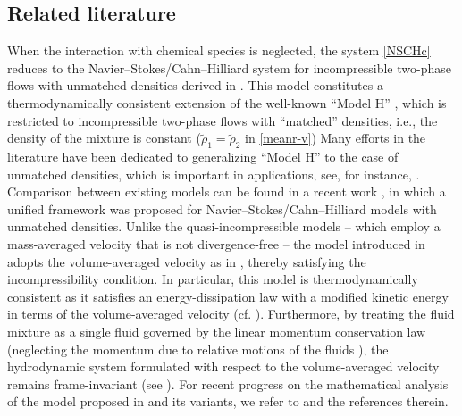 \documentclass[11pt,reqno]{amsart}
\begin{document}
\subsection{Related literature}
When the interaction with chemical species is neglected, the system \eqref{NSCHc} reduces to the Navier--Stokes/Cahn--Hilliard system for incompressible two-phase flows with unmatched densities derived in \cite{AGG2012}. This model constitutes a thermodynamically consistent extension of the well-known ``Model H'' \cite{GPV96,HH77}, which is restricted to incompressible two-phase flows with ``matched'' densities, i.e., the density of the mixture is constant ($\widetilde{\rho}_1=\widetilde{\rho}_2$ in \eqref{meanr-v})
Many efforts in the literature have been dedicated to generalizing ``Model H'' to the case of unmatched densities, which is important in applications, see, for instance, \cite{Aki14,Bo02,DSS2007,LT98,Shen2013,SSBZ2017}. Comparison between existing models can be found in a recent work \cite{ten2023}, in which a unified framework was proposed for Navier--Stokes/Cahn--Hilliard models with unmatched densities. Unlike the quasi-incompressible models \cite{LT98,Shen2013,Aki14,SSBZ2017} -- which employ a mass-averaged velocity that is not divergence-free -- the model introduced in \cite{AGG2012} adopts the volume-averaged velocity as in \cite{Bo02,DSS2007}, thereby satisfying the incompressibility condition. In particular, this model is thermodynamically consistent as it satisfies an energy-dissipation law with a modified kinetic energy in terms of the volume-averaged velocity (cf. \cite{Bo02,DSS2007}). Furthermore, by treating the fluid mixture as a single fluid governed by the linear momentum conservation law (neglecting the momentum due to relative motions of the fluids \cite{GPV96}), the hydrodynamic system formulated with respect to the volume-averaged velocity remains frame-invariant (see \cite[Remark 2.2]{AGG2012}). For recent progress on the mathematical analysis of the model proposed in \cite{AGG2012} and its variants, we refer to \cite{ADG2013,ADG2013-2,AGG2023,AGP2024,Frigeri2016,Frigeri2021,GalGW2019, Gior2021,G2021,GK23} and the references therein.
\end{document}
